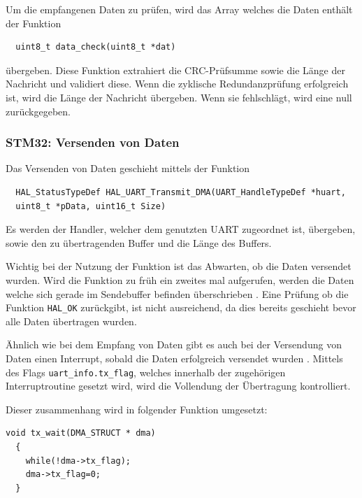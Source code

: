 \smallskip

Um die empfangenen Daten zu prüfen, wird das Array welches die Daten enthält der Funktion 
\begin{lstlisting}
  uint8_t data_check(uint8_t *dat)
\end{lstlisting}
übergeben. Diese Funktion extrahiert die CRC-Prüfsumme sowie die Länge der Nachricht und validiert diese. Wenn die zyklische Redundanzprüfung erfolgreich
ist, wird die Länge der Nachricht übergeben. Wenn sie fehlschlägt, wird eine null zurückgegeben.

\newpage

\subsubsection{STM32: Versenden von Daten}

Das Versenden von Daten geschieht mittels der Funktion \citep{HAL_Description}
\begin{lstlisting}
  HAL_StatusTypeDef HAL_UART_Transmit_DMA(UART_HandleTypeDef *huart,
  uint8_t *pData, uint16_t Size)
\end{lstlisting}

Es werden der Handler, welcher dem genutzten \ac{UART} zugeordnet ist, übergeben, sowie den zu übertragenden Buffer und die Länge des Buffers. 

\smallskip

Wichtig bei der Nutzung der Funktion ist das Abwarten, ob die Daten versendet wurden. Wird die Funktion zu früh ein zweites mal aufgerufen, werden die Daten
welche sich gerade im Sendebuffer befinden überschrieben \citep{HAL_Description}. Eine Prüfung ob die Funktion \lstinline!HAL_OK! zurückgibt, ist nicht ausreichend,
da dies bereits geschieht bevor alle Daten übertragen wurden.

\smallskip

Ähnlich wie bei dem Empfang von Daten gibt es auch bei der Versendung von Daten einen Interrupt, sobald die Daten erfolgreich versendet wurden \citep{HAL_Description}. Mittels des
Flags \lstinline!uart_info.tx_flag!, welches innerhalb der zugehörigen Interruptroutine gesetzt wird, wird die Vollendung der Übertragung kontrolliert.

\smallskip

Dieser zusammenhang wird in folgender Funktion umgesetzt:

\begin{lstlisting}[caption={\textit{Warten auf Versand}}]
  void tx_wait(DMA_STRUCT * dma)
  {
    while(!dma->tx_flag);						
    dma->tx_flag=0;								
  }
\end{lstlisting}

